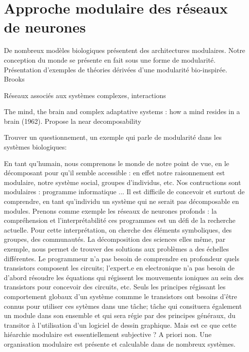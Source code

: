 \chapter{Approche modulaire des réseaux de neurones}
De nombreux modèles biologiques présentent des architectures modulaires. Notre conception du monde se présente en fait sous une forme de modularité.
Présentation d'exemples de théories dérivées d'une modularité bio-inspirée. 
Brooks \cite{brooks_sumsumption_85}

Réseaux associés aux systèmes complexes, interactions

The mind, the brain and complex adaptative systems : how a mind resides in a brain (1962). Propose la near decomposability 

Trouver un questionnement, un exemple qui parle de modularité dans les systèmes biologiques:  

En tant qu'humain, nous comprenons le monde de notre point de vue, en le décomposant pour qu'il semble accessible : en effet notre raisonnement est modulaire, notre système social, groupes d'individus, etc. Nos contructions sont modulaires : programme informatique ... Il est difficile de concevoir et surtout de comprendre, en tant qu'individu un système qui ne serait pas décomposable en modules. Prenons comme exemple les réseaux de neurones profonds : la compréhension  et l'interprétabilité ces programmes est un défi de la recherche actuelle. Pour cette interprétation, on cherche des éléments symboliques, des groupes, des communautés. 
La décomposition des sciences elles même, par exemple, nous permet de trouver des solutions aux problèmes a des échelles différentes. Le programmeur n'a pas besoin de comprendre en profondeur quels transistors composent les circuits; l'expert.e en electronique n'a pas besoin de d'abord résoudre les équations qui régissent les mouvements ioniques au sein des transistors pour concevoir des circuits, etc. Seuls les principes régissant les comportement globaux d'un système commme le transistors ont besoins d'être connus pour utiliser ces sytèmes dans une tâche; tâche qui consituera également un module dans son ensemble et qui sera régie par des principes généraux, du transitor à l'utilisation d'un logiciel de dessin graphique. 
Mais est ce que cette hiéarchie modulaire est essentiellement subjective ? A priori non. Une organisation modulaire est présente et calculable dans de nombreux systèmes. 

